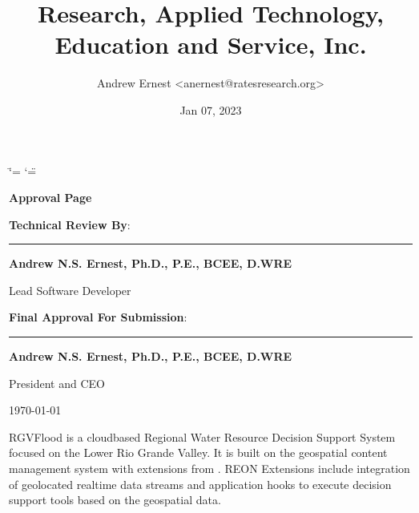\documentclass[letterpaper,12pt,english,openany,oneside]{sphinxmanual}
\title{Research, Applied Technology, Education and Service, Inc.}
\date{Jan 07, 2023}
\author{Andrew Ernest <anernest@ratesresearch.org>}
\begin{document}
\ifdefined\shorthandoff
  \ifnum\catcode`\=\string=\active\shorthandoff{=}\fi
  \ifnum\catcode`\"=\active{}\fi
\fi

\pagestyle{empty}
 
\sphinxmaketitle
    \newcommand\signature[3]{%
    {\sffamily
    \vspace{1cm}\par
    \textbf{#1}:\par
        \begin{minipage}{10cm}
        \centering
        \vspace{3cm}\par
        \rule{10cm}{1pt}\par
        \textbf{#2}\par
        #3%
        \end{minipage}
    }
    }
    \newcommand\insertdate[1][\today]{\vfill\begin{flushright}#1\end{flushright}}
    {\LARGE\sffamily \textbf{Approval Page}}
    
    \signature{Technical Review By}{Andrew N.S. Ernest, Ph.D., P.E., BCEE, D.WRE}{Lead Software Developer}
    
    \signature{Final Approval For Submission}{Andrew N.S. Ernest, Ph.D., P.E., BCEE, D.WRE}{President and CEO}
        
    \insertdate

\pagestyle{plain}
\sphinxtableofcontents
\pagestyle{normal}
\label{\detokenize{index::doc}}


\sphinxAtStartPar
RGVFlood is a cloud\sphinxhyphen{}based Regional Water Resource Decision Support System focused on the Lower Rio Grande Valley. It is built on the  geospatial content management system with extensions from . REON Extensions include integration of geolocated real\sphinxhyphen{}time data streams and application hooks to execute decision support tools based on the geospatial data.

\sphinxstepscope
\end{document}
